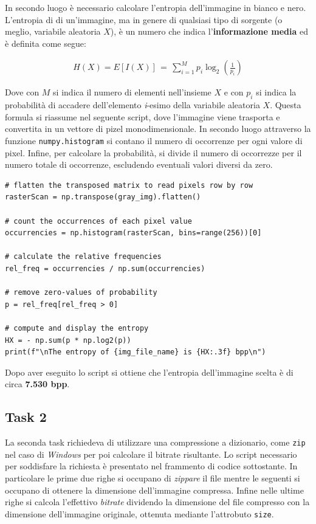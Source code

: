 \FloatBarrier\noindent In secondo luogo è necessario calcolare l'entropia dell'immagine in bianco e nero. L'entropia di di un'immagine, ma in genere di qualsiasi tipo di sorgente (o meglio, variabile aleatoria $X$), è un numero che indica l'\textbf{informazione media} ed è definita come segue:

\begin{gather*}
    H(X) = E[I(X)] \, = \, \sum_{i = 1}^M p_i\log_2\left( \frac{1}{p_i} \right)
\end{gather*}

\noindent Dove con $M$ si indica il numero di elementi nell'insieme $X$ e con $p_i$ si indica la probabilità di accadere dell'elemento \textit{i}-esimo della variabile aleatoria $X$. Questa formula si riassume nel seguente script, dove l'immagine viene trasporta e convertita in un vettore di pizel monodimensionale. In secondo luogo attraverso la funzione \texttt{numpy.histogram} si contano il numero di occorrenze per ogni valore di pixel. Infine, per calcolare la probabilità, si divide il numero di occorrezze per il numero totale di occorrenze, escludendo eventuali valori diversi da zero.


\begin{lstlisting}
# flatten the transposed matrix to read pixels row by row
rasterScan = np.transpose(gray_img).flatten()

# count the occurrences of each pixel value
occurrencies = np.histogram(rasterScan, bins=range(256))[0]

# calculate the relative frequencies
rel_freq = occurrencies / np.sum(occurrencies)

# remove zero-values of probability
p = rel_freq[rel_freq > 0]

# compute and display the entropy
HX = - np.sum(p * np.log2(p))
print(f"\nThe entropy of {img_file_name} is {HX:.3f} bpp\n")
\end{lstlisting}

\noindent Dopo aver eseguito lo script si ottiene che l'entropia dell'immagine scelta è di circa \textbf{7.530 bpp}.


\subsection*{Task 2}
La seconda task richiedeva di utilizzare una compressione a dizionario, come \texttt{zip} nel caso di \textsl{Windows} per poi calcolare il bitrate risultante. Lo script necessario per soddisfare la richiesta è presentato nel frammento di codice sottostante. In particolare le prime due righe si occupano di \textsl{zippare} il file mentre le seguenti si occupano di ottenere la dimensione dell'immagine compressa. Infine nelle ultime righe si calcola l'effettivo \textsl{bitrate} dividendo la dimensione del file compresso con la dimensione dell'immagine originale, ottenuta mediante l'attrobuto \texttt{size}.

